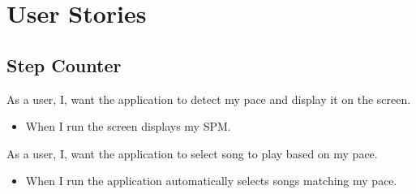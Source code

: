 \section{User Stories}
\subsection{Step Counter}
{As a user, I, want the application to detect my pace and display it on the screen. }
{\begin{itemize}
\item When I run the screen displays my SPM.
\end{itemize}}

{As a user, I, want the application to select song to play based on my pace.}
{\begin{itemize}
\item When I run the application automatically selects songs matching my pace.
\end{itemize}}